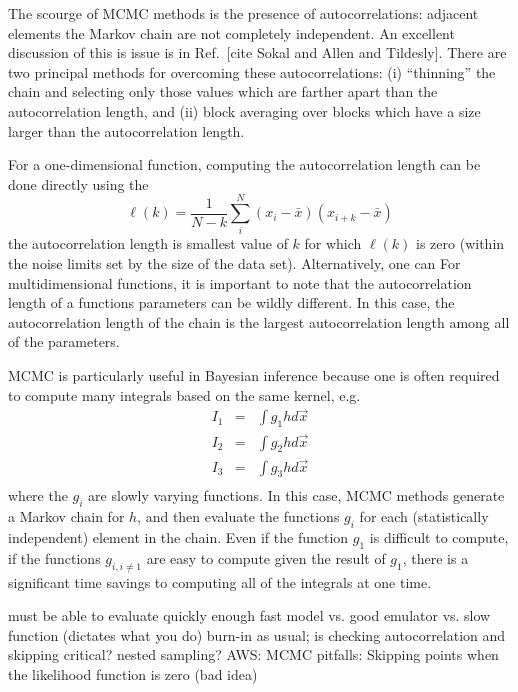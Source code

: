 The scourge of MCMC methods is the presence of autocorrelations:
adjacent elements the Markov chain are not completely independent. An
excellent discussion of this is issue is in Ref.~[cite Sokal and Allen
  and Tildesly]. There are two principal methods for overcoming these
autocorrelations: (i) ``thinning'' the chain and selecting only those
values which are farther apart than the autocorrelation length, and
(ii) block averaging over blocks which have a size larger than the
autocorrelation length.

For a one-dimensional function, computing the autocorrelation length
can be done directly using the 
\begin{equation}
  \ell(k) = \frac{1}{N-k} \sum_i^{N} (x_i- \bar{x})(x_{i+k}- \bar{x})
\end{equation}
the autocorrelation length is smallest value of $k$ for which
$\ell(k)$ is zero (within the noise limits set by the size of the data
set). Alternatively, one can  For multidimensional functions, it is important to note that
the autocorrelation length of a functions parameters can be wildly
different. In this case, the autocorrelation length of the chain is
the largest autocorrelation length among all of the parameters.

MCMC is particularly useful in Bayesian inference because one is
often required to compute many integrals based on the same kernel,
e.g.
\begin{eqnarray}
  I_1 & = & \int g_1 h d \vec{x} \nonumber \\
  I_2 & = & \int g_2 h d \vec{x} \nonumber \\
  I_3 & = & \int g_3 h d \vec{x} \nonumber \\
\end{eqnarray}
where the $g_i$ are slowly varying functions. In this case, MCMC
methods generate a Markov chain for $h$, and then evaluate the
functions $g_i$ for each (statistically independent) element in the
chain. Even if the function $g_1$ is difficult to compute, 
if the functions $g_{i,i\neq 1}$ are easy to compute given the
result of $g_1$, there is a significant time savings to computing
all of the integrals at one time.


  \bi
    \I must be able to evaluate quickly enough
    \I fast model vs. good emulator vs. slow function (dictates what you do)
    \I burn-in as usual; is checking autocorrelation and skipping critical?
    \I nested sampling?
    \I AWS: MCMC pitfalls: Skipping points when the likelihood
    function is zero (bad idea)
  \ei


